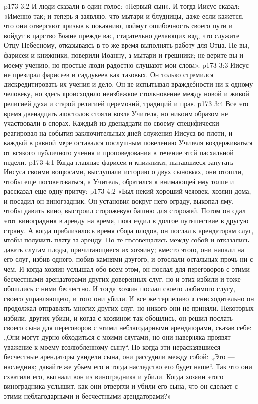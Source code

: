 \vs p173 3:2 И люди сказали в один голос: «Первый сын». И тогда Иисус сказал: «Именно так; и теперь я заявляю, что мытари и блудницы, даже если кажется, что они отвергают призыв к покаянию, поймут ошибочность своего пути и войдут в царство Божие прежде вас, старательно делающих вид, что служите Отцу Небесному, отказываясь в то же время выполнять работу для Отца. Не вы, фарисеи и книжники, поверили Иоанну, а мытари и грешники; не верите вы и моему учению, но простые люди радостно слушают мои слова».
\vs p173 3:3 Иисус не презирал фарисеев и саддукеев как таковых. Он только стремился дискредитировать их учения и дело. Он не испытывал враждебности ни к одному человеку, но здесь происходило неизбежное столкновение между новой и живой религией духа и старой религией церемоний, традиций и прав.
\vs p173 3:4 Все это время двенадцать апостолов стояли возле Учителя, но никоим образом не участвовали в спорах. Каждый из двенадцати по\hyp{}своему специфически реагировал на события заключительных дней служения Иисуса во плоти, и каждый в равной мере оставался послушным повелению Учителя воздерживаться от всякого публичного учения и проповедования в течение этой пасхальной недели.
\vs p173 4:1 Когда главные фарисеи и книжники, пытавшиеся запутать Иисуса своими вопросами, выслушали историю о двух сыновьях, они отошли, чтобы еще посоветоваться, а Учитель, обратился к внимающей ему толпе и рассказал еще одну притчу:
\vs p173 4:2 \pc «Был некий хороший человек, хозяин дома, и посадил он виноградник. Он установил вокруг него ограду, выкопал яму, чтобы давить вино, выстроил сторожевую башню для сторожей. Потом он сдал этот виноградник в аренду на время, пока ездил в долгое путешествие в другую страну. А когда приблизилось время сбора плодов, он послал к арендаторам слуг, чтобы получить плату за аренду. Но те посовещались между собой и отказались давать слугам плоды, причитающиеся их хозяину; вместо этого, они напали на его слуг, избив одного, побив камнями другого, и отослали остальных прочь ни с чем. И когда хозяин услышал обо всем этом, он послал для переговоров с этими бесчестными арендаторами других доверенных слуг, но и этих избили и тоже обошлись с ними бесчестно. И тогда хозяин послал своего любимого слугу, своего управляющего, и того они убили. И все же терпеливо и снисходительно он продолжал отправлять многих других слуг, но никого они не приняли. Некоторых избили, других убили, и когда с хозяином так обошлись, он решил послать своего сына для переговоров с этими неблагодарными арендаторами, сказав себе: „Они могут дурно обходиться с моими слугами, но они наверняка проявят уважение к моему возлюбленному сыну“. Но когда эти нераскаявшиеся бесчестные арендаторы увидели сына, они рассудили между собой: „Это --- наследник; давайте же убьем его и тогда наследство его будет наше“. Так что они схватили его, выгнали вон из виноградника и убили. Когда хозяин этого виноградника услышит, как они отвергли и убили его сына, что он сделает с этими неблагодарными и бесчестными арендаторами?»
